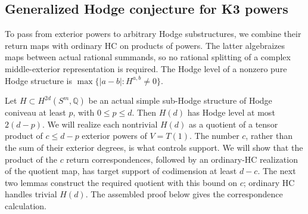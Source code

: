 \documentclass[11pt]{amsart}
\newcommand{\Q}{\mathbb Q}
\theoremstyle{definition}
\theoremstyle{remark}
\numberwithin{equation}{section}
\begin{document}
\subsection{Generalized Hodge conjecture for K3 powers}
\label{ghc:subsec:k3-ghc}
\label{ghc:subsec:orthogonal-ghc}

To pass from exterior powers to arbitrary Hodge substructures, we
combine their return maps with ordinary HC on products of powers.
The latter algebraizes maps between actual rational summands, so
no rational splitting of a complex middle-exterior representation
is required.  The Hodge level of a nonzero pure Hodge structure is
$\max\{|a-b|:H^{a,b}\ne0\}$.

Let $H\subset H^{2d}(S^m,\Q)$ be an actual simple sub-Hodge
structure of Hodge coniveau at least $p$, with $0\le p\le d$.
Then $H(d)$ has Hodge level at most $2(d-p)$.  We will realize
each nontrivial $H(d)$ as a quotient of a tensor product of
$c\le d-p$ exterior powers of $V=T(1)$.  The number $c$, rather
than the sum of their exterior degrees, is what controls support.
We will show that the product of the $c$ return correspondences,
followed by an ordinary-HC realization of the quotient map, has
target support of codimension at least $d-c$.  The next two lemmas
construct the required quotient with this bound on $c$; ordinary
HC handles trivial $H(d)$.  The assembled proof below gives the
correspondence calculation.
\end{document}
